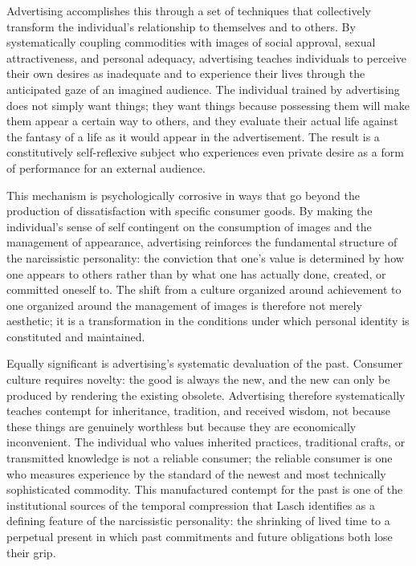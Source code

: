 \documentclass[12pt]{memoir}
\begin{document}
Advertising accomplishes this through a set of techniques that collectively transform the
individual's relationship to themselves and to others. By systematically coupling commodities
with images of social approval, sexual attractiveness, and personal adequacy, advertising
teaches individuals to perceive their own desires as inadequate and to experience their lives
through the anticipated gaze of an imagined audience. The individual trained by advertising
does not simply want things; they want things because possessing them will make them appear a
certain way to others, and they evaluate their actual life against the fantasy of a life as it
would appear in the advertisement. The result is a constitutively self-reflexive subject who
experiences even private desire as a form of performance for an external audience.

This mechanism is psychologically corrosive in ways that go beyond the production of
dissatisfaction with specific consumer goods. By making the individual's sense of self
contingent on the consumption of images and the management of appearance, advertising
reinforces the fundamental structure of the narcissistic personality: the conviction that one's
value is determined by how one appears to others rather than by what one has actually done,
created, or committed oneself to. The shift from a culture organized around achievement to one
organized around the management of images is therefore not merely aesthetic; it is a
transformation in the conditions under which personal identity is constituted and maintained.

Equally significant is advertising's systematic devaluation of the past. Consumer culture
requires novelty: the good is always the new, and the new can only be produced by rendering the
existing obsolete. Advertising therefore systematically teaches contempt for inheritance,
tradition, and received wisdom, not because these things are genuinely worthless but because
they are economically inconvenient. The individual who values inherited practices, traditional
crafts, or transmitted knowledge is not a reliable consumer; the reliable consumer is one who
measures experience by the standard of the newest and most technically sophisticated commodity.
This manufactured contempt for the past is one of the institutional sources of the temporal
compression that Lasch identifies as a defining feature of the narcissistic personality: the
shrinking of lived time to a perpetual present in which past commitments and future obligations
both lose their grip.\citep[65--70]{lasch1979}
\end{document}
